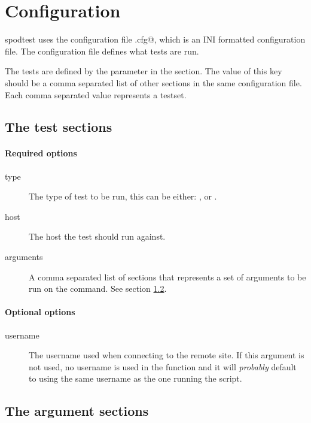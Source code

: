 \section{Configuration}
\gls{spodtest} uses the configuration file \verb@spodconf.cfg@, which is an INI
formatted configuration file. The configuration file defines what tests are
run.

The tests are defined by the \verb@tests@ parameter in the \verb@spod@ section.
The value of this key should be a comma separated list of other sections in the
same configuration file. Each comma separated value represents a \gls{testset}.


\subsection{The test sections}
\label{sec:test_sec}


\paragraph*{Required options}

\begin{description}
    \item[type] The type of test to be run, this can be either: \verb@scp@,
        \verb@sftp@ or \verb@rsync@.
    \item[host] The host the test should run against.
    \item[arguments] A comma separated list of sections that represents a set
        of arguments to be run on the command. See section
        \ref{sec:argument_sec}.
\end{description}

\paragraph*{Optional options}

\begin{description}
    \item[username] The username used when connecting to the remote site. If
        this argument is not used, no username is used in the function and it
        will \textit{probably} default to using the same username as the one
        running the script.
\end{description}


\subsection{The argument sections}
\label{sec:argument_sec}

